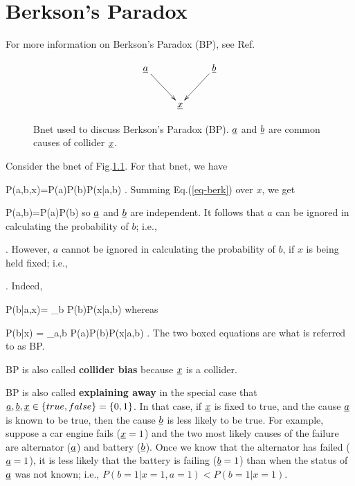 \chapter{Berkson's Paradox }

For more information
on Berkson's Paradox (BP), see
Ref.\cite{wiki-berkson}


\begin{figure}[h!]
$$
\xymatrix{
\rva\ar[rd]
&&\rvb\ar[ld]
\\
&\rvx
}
$$
\caption{
Bnet used to discuss Berkson's Paradox (BP).
${\underline{a}}$ and ${\underline{b}}$ are common causes of
collider
${\underline{x}}$.}
\label{fig-berkson-bnet}
\end{figure}

Consider the bnet of Fig.\ref{fig-berkson-bnet}.
For that bnet, we have

\beq
P(a,b,x)=P(a)P(b)P(x|a,b)
\;.
\label{eq-berk}
\eeq
Summing Eq.(\ref{eq-berk}) over $x$, we get

\beq
P(a,b)=P(a)P(b)
\eeq
so ${\underline{a}}$ and ${\underline{b}}$ are independent.
It follows that
$a$ can be ignored in calculating
the probability of $b$; i.e.,

\beq
{}
\;.
\eeq
However,
$a$ cannot be ignored in calculating
the probability of $b$,
if $x$ is being held fixed; i.e., 
 

\beq
{}
\;.
\eeq
Indeed,

\beq
P(b|a,x)=
{\sum_b P(b)P(x|a,b)}
\eeq
whereas

\beq
P(b|x)
=
{\sum_{a,b} P(a)P(b)P(x|a,b)}
\;.
\eeq
The two boxed 
equations are
what is referred to as BP.


BP is also called  {\bf collider bias} because 
${\underline{x}}$ is a collider.

BP is also called {\bf explaining away}
in the special case that
${\underline{a}},{\underline{b}}, {\underline{x}}\in \{true, false\}=\{0,1\}$.
In that case, if ${\underline{x}}$ is fixed
to true, and the cause
${\underline{a}}$ is known to be true, 
then the cause ${\underline{b}}$ is
less likely
to be true.
For example,
suppose a car engine fails (${\underline{x}}=1$)
and the two most likely
causes of the failure
are alternator (${\underline{a}}$)
and battery (${\underline{b}}$).
Once we know
that the alternator has failed
 (${\underline{a}}=1$), it is 
less likely that the
battery is failing (${\underline{b}}=1$)
than when the status of
${\underline{a}}$ was not known; i.e., 
$P(b=1|x=1,a=1)<P(b=1|x=1)$.



